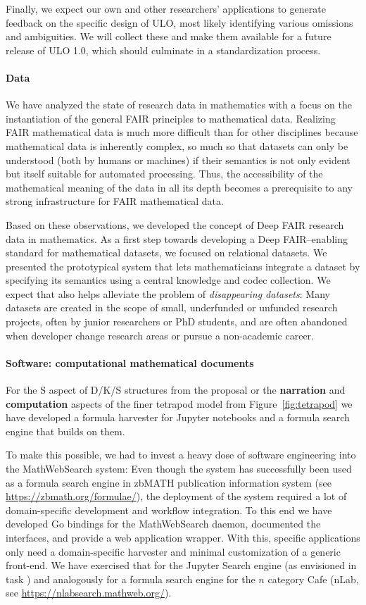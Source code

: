 Finally, we expect our own and other researchers' applications to generate feedback on the specific design of ULO, most likely identifying various omissions and ambiguities.
We will collect these and make them available for a future release of ULO 1.0, which should culminate in a standardization process.

\paragraph{Data}
We have analyzed the state of research data in mathematics with a focus on the instantiation of the general FAIR principles to mathematical data.
Realizing FAIR mathematical data is much more difficult than for other disciplines because mathematical data is inherently complex, so much so that datasets can only be understood (both by humans or machines) if their semantics is not only evident but itself suitable for automated processing.
Thus, the accessibility of the mathematical meaning of the data in all its depth becomes a prerequisite to any strong infrastructure for FAIR mathematical data.

Based on these observations, we developed the concept of Deep FAIR research data in mathematics.
As a first step towards developing a Deep FAIR--enabling standard for mathematical datasets, we focused on relational datasets.
We presented the prototypical \dmh system that lets mathematicians integrate a dataset by specifying its semantics using a central knowledge and codec collection.
We expect that \dmh also helps alleviate the problem of \emph{disappearing datasets}:
Many datasets are created in the scope of small, underfunded or unfunded research projects, often by junior researchers or PhD students, and are often abandoned when developer change research areas or pursue a non-academic career.

\paragraph{Software: computational mathematical documents}
For the S aspect of D/K/S structures from the \pn proposal or the \textbf{narration} and \textbf{computation} aspects of the finer tetrapod model from Figure~\ref{fig:tetrapod} we have developed a formula harvester for Jupyter notebooks and a formula search engine that builds on them.

To make this possible, we had to invest a heavy dose of software engineering into the MathWebSearch system: Even though the system has successfully been used as a formula search engine in zbMATH publication information system (see \url{https://zbmath.org/formulae/}), the deployment of the system required a lot of domain-specific development and workflow integration.
To this end we have developed Go bindings for the MathWebSearch daemon, documented the interfaces, and provide a web application wrapper.
With this, specific applications only need a domain-specific harvester and minimal customization of a generic front-end. 
We have exercised that for the Jupyter Search engine  (as envisioned in task ) and analogously for a formula search engine for the $n$ category Cafe (nLab, see \url{https://nlabsearch.mathweb.org/}).


